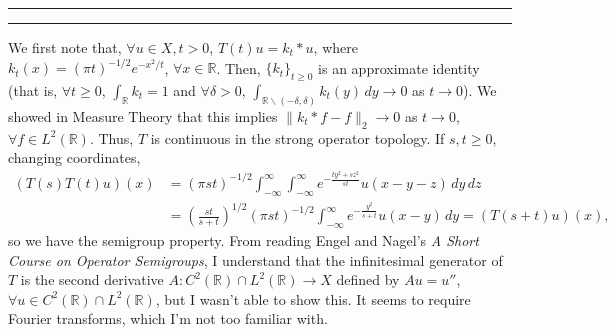\documentclass[11pt]{article}
\newcounter{questionCounter}
\newcounter{partCounter}[questionCounter]
\newenvironment{question}[2][\arabic{questionCounter}]{%
    \setcounter{partCounter}{0}%
    \vspace{.25in} \hrule \vspace{0.5em}%
        \noindent{\bf #2}%
    \vspace{0.8em} \hrule \vspace{.10in}%
    \addtocounter{questionCounter}{1}%
}{}
\newcommand{\sminus}{\backslash}        %
\newcommand{\R}{\mathbb{R}}             %
\begin{document}
\begin{question}{Problem 8}
We first note that, $\forall u \in X, t > 0$,
$T(t)u = k_t * u$, where $k_t(x) = (\pi t)^{-1/2}e^{-x^2/t}$,
$\forall x \in \R$. Then, $\{k_t\}_{t \geq 0}$ is an approximate identity (that
is, $\forall t \geq 0$, $\int_\R k_t = 1$ and $\forall \delta > 0$,
$\int_{\R\sminus(-\delta,\delta)} k_t(y) \, dy \to 0$ as $t \to 0$). We showed
in Measure Theory that this implies $\|k_t * f - f\|_2 \to 0$ as
$t \to 0$, $\forall f \in L^2(\R)$. Thus, $T$ is continuous in the strong
operator topology. If $s,t \geq 0$, changing coordinates,
\begin{align*}
(T(s)T(t)u)(x)
 &  = (\pi st)^{-1/2} \int_{-\infty}^\infty \int_{-\infty}^\infty
        e^{-\frac{ty^2 + sz^2}{st}} u(x - y - z) \, dy \, dz    \\
 &  = \left( \frac{st}{s + t} \right)^{1/2} (\pi st)^{-1/2}
        \int_{-\infty}^\infty e^{-\frac{y^2}{s + t}} u(x - y) \, dy
    = (T(s + t)u)(x),
\end{align*}
so we have the semigroup property. From reading Engel and Nagel's \emph{A Short
Course on Operator Semigroups}, I understand that the infinitesimal generator
of $T$ is the second derivative $A : C^2(\R) \cap L^2(\R) \to X$ defined by
$Au = u''$, $\forall u \in C^2(\R) \cap L^2(\R)$, but I wasn't able to show
this. It seems to require Fourier transforms, which I'm not too familiar with.
\end{question}
\end{document}
